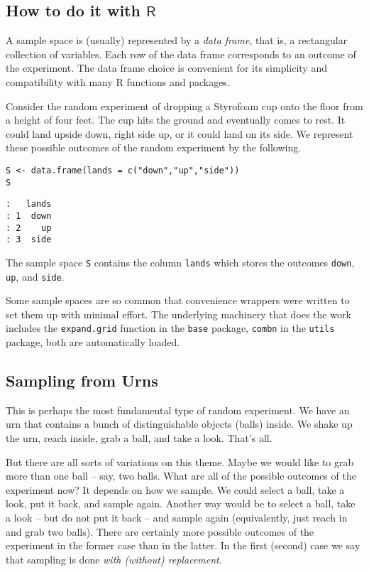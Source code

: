 \subsection{How to do it with \(\mathsf{R}\)}
\label{sec-4-1-1}

A sample space is (usually) represented by a \emph{data frame}, that is, a rectangular collection of variables.
Each row of the data frame corresponds to an outcome of the experiment.
The data frame choice is convenient for its simplicity and compatibility with many R functions and packages.

Consider the random experiment of dropping a Styrofoam cup onto the
floor from a height of four feet. The cup hits the ground and
eventually comes to rest. It could land upside down, right side up, or
it could land on its side. We represent these possible outcomes of the
random experiment by the following.

\begin{Verbatim}
S <- data.frame(lands = c("down","up","side"))
S
\end{Verbatim}

\begin{verbatim}
:   lands
: 1  down
: 2    up
: 3  side
\end{verbatim}

The sample space \texttt{S} contains the column \texttt{lands} which stores the
outcomes \texttt{down}, \texttt{up}, and \texttt{side}.



Some sample spaces are so common that convenience wrappers were
written to set them up with minimal effort. The underlying machinery
that does the work includes the \texttt{expand.grid} function in the \texttt{base}
package, \texttt{combn} in the \texttt{utils} package, both are automatically loaded.

\subsection{Sampling from Urns}
\label{sec-4-1-2}

This is perhaps the most fundamental type of random experiment. We
have an urn that contains a bunch of distinguishable objects (balls)
inside. We shake up the urn, reach inside, grab a ball, and take a
look. That's all.

But there are all sorts of variations on this theme. Maybe we would
like to grab more than one ball -- say, two balls. What are all of the
possible outcomes of the experiment now? It depends on how we
sample. We could select a ball, take a look, put it back, and sample
again. Another way would be to select a ball, take a look -- but do
not put it back -- and sample again (equivalently, just reach in and
grab two balls). There are certainly more possible outcomes of the
experiment in the former case than in the latter. In the first
(second) case we say that sampling is done \emph{with (without)
replacement}.


